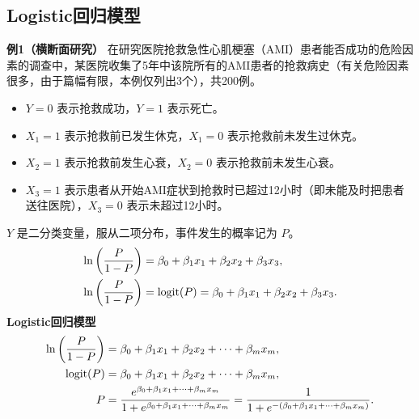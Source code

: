 \subsection{Logistic回归模型}
\textbf{例1（横断面研究）} 在研究医院抢救急性心肌梗塞（AMI）患者能否成功的危险因素的调查中，某医院收集了5年中该院所有的AMI患者的抢救病史（有关危险因素很多，由于篇幅有限，本例仅列出3个），共200例。
\begin{itemize}
\item $Y=0$ 表示抢救成功，$Y=1$ 表示死亡。
\item $X_1=1$ 表示抢救前已发生休克，$X_1=0$ 表示抢救前未发生过休克。
\item $X_2=1$ 表示抢救前发生心衰，$X_2=0$ 表示抢救前未发生心衰。
\item $X_3=1$ 表示患者从开始AMI症状到抢救时已超过12小时（即未能及时把患者送往医院），$X_3=0$ 表示未超过12小时。
\end{itemize}

$Y$ 是二分类变量，服从二项分布，事件发生的概率记为 $P$。
\begin{align*}
\ln\left(\frac{P}{1-P}\right)&=\beta_0+\beta_1x_1+\beta_2x_2+\beta_3x_3,\\
\ln\left(\frac{P}{1-P}\right)&=\operatorname{logit}(P)=\beta_0+\beta_1x_1+\beta_2x_2+\beta_3x_3.
\end{align*}
\textbf{Logistic回归模型}
\begin{align*}
\ln\left(\frac P{1-P}\right)&=\beta_0+\beta_1x_1+\beta_2x_2+\cdots+\beta_mx_m,\\
\operatorname{logit}(P)&=\beta_0+\beta_1x_1+\beta_2x_2+\cdots+\beta_mx_m,\\
P&=\frac{e^{\beta_0+\beta_1x_1+\cdots+\beta_mx_m}}{1+e^{\beta_0+\beta_1x_1+\cdots+\beta_mx_m}}
 =\frac{1}{1+e^{-(\beta_0+\beta_1x_1+\cdots+\beta_mx_m)}}.
\end{align*}

